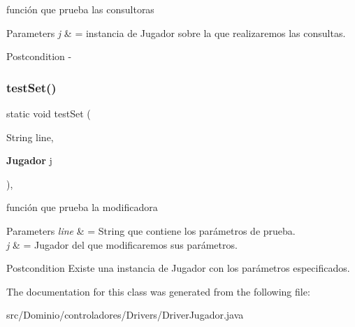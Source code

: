 función que prueba las consultoras 


\begin{DoxyParams}{Parameters}
{\em j} & = instancia de Jugador sobre la que realizaremos las consultas. \\
\hline
\end{DoxyParams}
\begin{DoxyPostcond}{Postcondition}
-\/ 
\end{DoxyPostcond}
\mbox{\label{class_dominio_1_1controladores_1_1_drivers_1_1_driver_jugador_a17643c9a9ea14ccf5a600ce0bafb07a1}} 
\subsubsection{test\+Set()}
{\footnotesize\ttfamily static void test\+Set (\begin{DoxyParamCaption}\item[{String}]{line,  }\item[{\textbf{ Jugador}}]{j }\end{DoxyParamCaption})\hspace{0.3cm}{\ttfamily [inline]}, {\ttfamily [static]}}



función que prueba la modificadora 


\begin{DoxyParams}{Parameters}
{\em line} & = String que contiene los parámetros de prueba. \\
\hline
{\em j} & = Jugador del que modificaremos sus parámetros. \\
\hline
\end{DoxyParams}
\begin{DoxyPostcond}{Postcondition}
Existe una instancia de Jugador con los parámetros especificados. 
\end{DoxyPostcond}


The documentation for this class was generated from the following file\+:\begin{DoxyCompactItemize}
\item 
src/\+Dominio/controladores/\+Drivers/Driver\+Jugador.\+java\end{DoxyCompactItemize}
